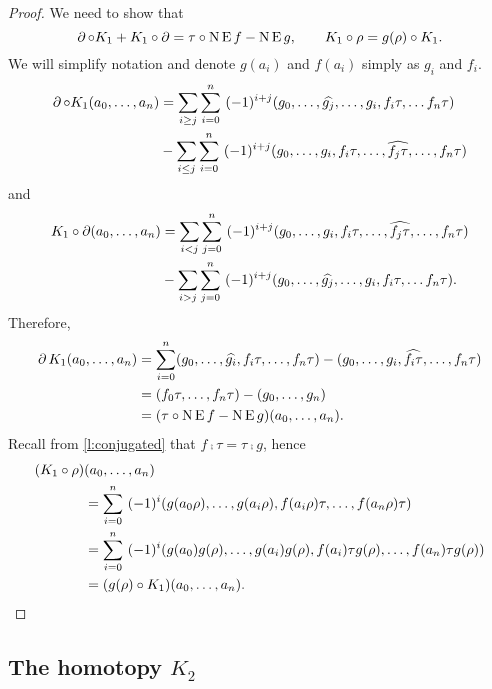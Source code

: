 \begin{proof}
	We need to show that
	\[
	\operatorname{\partial} \mathbin{\circ} K_1 + K_1 \mathbin{\circ} \operatorname{\partial} = \tau \mathbin{\circ} \operatorname{N} \operatorname{E} f - \operatorname{N} \operatorname{E} g,
	\qquad
	K_1 \mathbin{\circ} \rho = g(\rho) \mathbin{\circ} K_1.
	\]
	We will simplify notation and denote $g(a_i)$ and $f(a_i)$ simply as $g_i$ and $f_i$.
	\begin{align*}
		\operatorname{\partial} \mathbin{\circ} K_1(a_0,\dots,a_n) &=
		\sum_{i \geq j} \sum_{i=0}^n \ (-1)^{i+j} (g_0, \dots, \widehat{g_j}, \dots, g_i, f_i\tau, \dots f_n \tau) \\ & -
		\sum_{i \leq j} \sum_{i=0}^n \ (-1)^{i+j} (g_0, \dots, g_i, f_i \tau, \dots, \widehat{f_j\tau}, \dots, f_n \tau)
	\end{align*}
	and
	\begin{align*}
		K_1 \mathbin{\circ} \operatorname{\partial}(a_0,\dots,a_n) &=
		\sum_{i<j} \sum_{j=0}^n \ (-1)^{i+j} (g_0, \dots, g_i, f_i\tau, \dots, \widehat{f_j\tau}, \dots, f_n \tau) \\ & -
		\sum_{i > j} \sum_{j=0}^n \ (-1)^{i+j} (g_0, \dots, \widehat{g_j}, \dots, g_i, f_i\tau, \dots f_n \tau).
	\end{align*}
	Therefore,
	\begin{align*}
		\operatorname{\partial} K_1(a_0,\dots,a_n) &=
		\sum_{i=0}^n (g_0, \dots, \widehat{g_i}, f_i\tau, \dots, f_n \tau) -
		(g_0, \dots, g_i, \widehat{f_i\tau}, \dots, f_n \tau) \\ &=
		(f_0\tau, \dots, f_n\tau) - (g_0, \dots, g_n) \\ &=
		(\tau \mathbin{\circ} \operatorname{N} \operatorname{E} f - \operatorname{N} \operatorname{E} g)(a_0,\dots,a_n).
	\end{align*}
	Recall from \cref{l:conjugated} that $f \comp \tau = \tau \comp g$, hence
	\begin{align*}
		(K_1 \mathbin{\circ} \rho) &(a_0,\dots,a_n) \\ &=
		\sum_{i=0}^n \ (-1)^i (g(a_0 \rho), \dots, g(a_i\rho), f(a_i\rho)\tau, \dots, f(a_n\rho) \tau) \\ &=
		\sum_{i=0}^n \ (-1)^i (g(a_0) g(\rho), \dots, g(a_i)g(\rho), f(a_i)\tau g(\rho), \dots, f(a_n)\tau g(\rho)) \\ &=
		(g(\rho) \mathbin{\circ} K_1) (a_0,\dots,a_n).\qedhere
	\end{align*}
\end{proof}

\subsection{The homotopy $K_2$}

